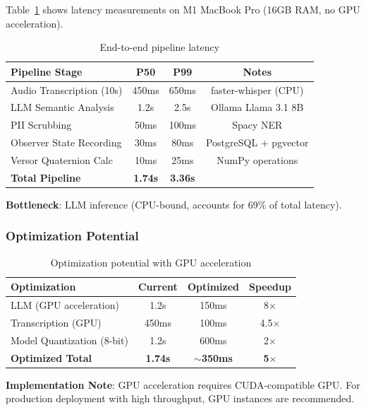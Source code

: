 Table~\ref{tab:latency} shows latency measurements on M1 MacBook Pro (16GB RAM, no GPU acceleration).

\begin{table}[h]
\centering
\caption{End-to-end pipeline latency}
\label{tab:latency}
\begin{tabular}{lccc}
\toprule
\textbf{Pipeline Stage} & \textbf{P50} & \textbf{P99} & \textbf{Notes} \\
\midrule
Audio Transcription (10s) & 450ms & 650ms & faster-whisper (CPU) \\
LLM Semantic Analysis & 1.2s & 2.5s & Ollama Llama 3.1 8B \\
PII Scrubbing & 50ms & 100ms & Spacy NER \\
Observer State Recording & 30ms & 80ms & PostgreSQL + pgvector \\
Versor Quaternion Calc & 10ms & 25ms & NumPy operations \\
\midrule
\textbf{Total Pipeline} & \textbf{1.74s} & \textbf{3.36s} & \\
\bottomrule
\end{tabular}
\end{table}

\textbf{Bottleneck}: LLM inference (CPU-bound, accounts for 69\% of total latency).

\subsubsection{Optimization Potential}

\begin{table}[h]
\centering
\caption{Optimization potential with GPU acceleration}
\label{tab:optimization}
\begin{tabular}{lccc}
\toprule
\textbf{Optimization} & \textbf{Current} & \textbf{Optimized} & \textbf{Speedup} \\
\midrule
LLM (GPU acceleration) & 1.2s & 150ms & 8$\times$ \\
Transcription (GPU) & 450ms & 100ms & 4.5$\times$ \\
Model Quantization (8-bit) & 1.2s & 600ms & 2$\times$ \\
\midrule
\textbf{Optimized Total} & \textbf{1.74s} & \textbf{$\sim$350ms} & \textbf{5$\times$} \\
\bottomrule
\end{tabular}
\end{table}

\textbf{Implementation Note}: GPU acceleration requires CUDA-compatible GPU. For production deployment with high throughput, GPU instances are recommended.

